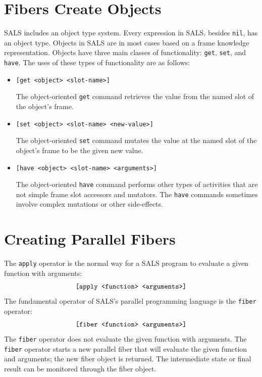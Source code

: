 \section{Fibers Create Objects}

SALS includes an object type system.  Every expression in SALS,
besides {\tt nil}, has an object type.  Objects in SALS are in most
cases based on a frame knowledge representation.  Objects have three
main classes of functionality: {\tt get}, {\tt set}, and {\tt have}.
The uses of these types of functionality are as follows:
\begin{itemize}
\item {\tt [get <object> <slot-name>]}

The object-oriented {\tt get} command retrieves the value from the
named slot of the object's frame.
\item {\tt [set <object> <slot-name> <new-value>]}

The object-oriented {\tt set} command mutates the value at the named
slot of the object's frame to be the given new value.
\item {\tt [have <object> <slot-name> <arguments>]}

The object-oriented {\tt have} command performs other types of
activities that are not simple frame slot accessors and mutators.  The
{\tt have} commands sometimes involve complex mutations or other
side-effects.
\end{itemize}

\section{Creating Parallel Fibers}

The {\tt apply} operator is the normal way for a SALS program to
evaluate a given function with arguments:
\begin{equation*}
\text{\tt [apply <function> <arguments>]}
\end{equation*}
The fundamental operator of SALS's parallel programming language is
the {\tt fiber} operator:
\begin{equation*}
\text{\tt [fiber <function> <arguments>]}
\end{equation*}
The {\tt fiber} operator does not evaluate the given function with
arguments.  The {\tt fiber} operator starts a new parallel fiber that
will evaluate the given function and arguments; the new fiber object
is returned.  The intermediate state or final result can be monitored
through the fiber object.

